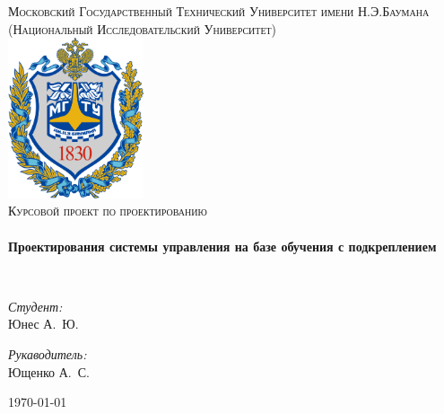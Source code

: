 \begin{titlepage}
\begin{center}

\textsc{\Large Московский Государственный Технический Университет имени Н.Э.Баумана}\\
\textsc{\large (Национальный Исследовательский Университет)}\\[1.5cm]

\includegraphics[width=0.3\textwidth]{img/logo.png}~\\[1cm]

\textsc{\Large Курсовой проект по проектированию}\\[0.5cm]

\HRule \\[0.4cm]
{ \LARGE \bfseries Проектирования системы управления на базе обучения с подкреплением\\[0.4cm] }

\HRule \\[1.5cm]

\noindent
\begin{minipage}{0.4\textwidth}
\begin{flushleft} \large
\emph{Студент:}\\
Юнес \textsc{А.~Ю.}
\end{flushleft}
\end{minipage}%
\begin{minipage}{0.4\textwidth}
\begin{flushright} \large
\emph{Рукаводитель:} \\
Ющенко \textsc{А.~С.}
\end{flushright}
\end{minipage}

\vfill

{\large \today}

\end{center}
\end{titlepage}